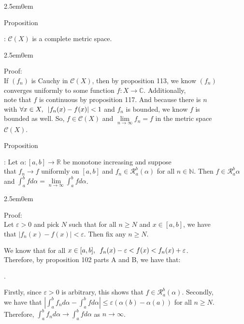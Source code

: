 \documentclass{book}
\newcommand{\hTwo}{%
   \color{MidnightBlue}%
   \fontsize{13}{15}\selectfont%
}
\newcommand{\hThree}{%
   \color{PineGreen!85!Orange}
   \fontsize{13}{15}\selectfont%
}
\newenvironment{myIndent}{%
   \begin{adjustwidth}{2.5em}{0em}%
}{%
   \end{adjustwidth}%
}
\newcommand{\myHS}{ \hspace{0.5em}}
\newcounter{PropNumber}
\newcommand{\propCount}[1][1]{%
   \addtocounter{PropNumber}{#1}%
   \thePropNumber%
}
\newcommand{\retTwo}{\hfill\bigbreak}
\begin{document}
{\begin{myIndent}\hTwo
   Proposition \propCount: $\mathscr{C}(X)$ is a complete metric space.\\ [-12pt]
   {\begin{myIndent}\hThree
      Proof:\\
      If $(f_n)$ is Cauchy in $\mathscr{C}(X)$, then by proposition 113, we know $(f_n)$\\ converges uniformly to some function $f: X \longrightarrow \mathbb{C}$. Additionally,\\ note that $f$ is continuous by proposition 117. And because there is $n$\\ with $\forall x \in X,\myHS |f_n(x) - f(x)| < 1$ and $f_n$ is bounded, we know $f$ is\\ bounded as well. So, $f \in \mathscr{C}(X)$ and $\lim\limits_{n\rightarrow \infty} f_n = f$ in the metric space\\ [-4pt] $\mathscr{C}(X)$.\retTwo
   \end{myIndent}}

   Proposition \propCount: Let $\alpha: [a, b] \longrightarrow \mathbb{R}$ be monotone increasing and suppose\\ that $f_n \rightarrow f$ uniformly on $[a, b]$ and $f_n \in \mathscr{R}_a^b(\alpha)$ for all $n \in \mathbb{N}$. Then $f \in \mathscr{R}_a^b{\alpha}$\\ and $\int_a^b fd\alpha = \lim\limits_{n\rightarrow \infty}\int_a^b fd\alpha$.\\ [-4pt]
   {\begin{myIndent}\hThree
      Proof:\\
      Let $\varepsilon > 0$ and pick $N$ such that for all $n \geq N$ and $x \in [a, b]$, we have\\ that $|f_n(x) - f(x)| < \varepsilon$. Then fix any $n \geq N$.\retTwo

      We know that for all $x \in [a, b], \myHS f_n(x) - \varepsilon < f(x) < f_n(x) + \varepsilon$.\\ Therefore, by proposition 102 parts A and B, we have that:

      {.\retTwo\par} 

      Firstly, since $\varepsilon > 0$ is arbitrary, this shows that $f \in \mathscr{R}_a^b(\alpha)$. Secondly,\\ we have that $\left|\int_a^b f_nd\alpha - \int_a^b f d\alpha\right| \leq \varepsilon(\alpha(b) - \alpha(a))$ for all $n \geq N$.\\ [-1pt] Therefore, $\int_a^b f_n d\alpha \rightarrow \int_a^b fd\alpha$ as $n \rightarrow \infty$.
   \end{myIndent}}


\end{myIndent}}
\end{document}
